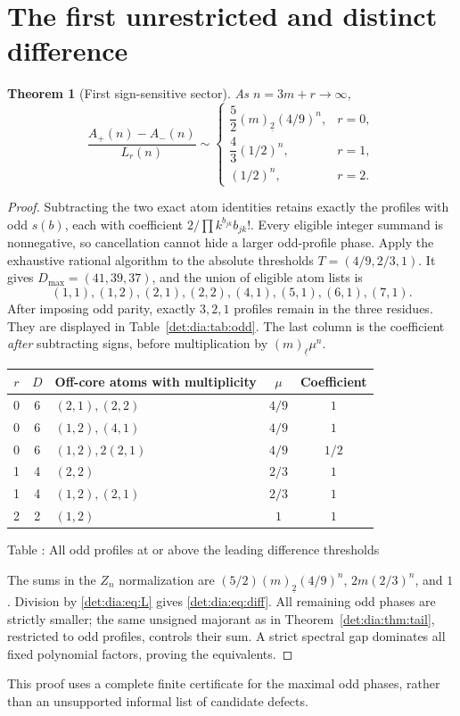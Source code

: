 \documentclass[11pt,letterpaper]{article}
\numberwithin{equation}{section}
\newtheorem{theorem}{Theorem}[section]
\theoremstyle{definition}\newtheorem{definition}[theorem]{Definition}
\theoremstyle{remark}\newtheorem{remark}[theorem]{Remark}
\newcommand{\fall}[2]{(#1)_{\underline{#2}}}
\begin{document}
\section{The first unrestricted and distinct difference}
\begin{theorem}[First sign-sensitive sector]\label{det:dia:thm:diff}
As $n=3m+r\to\infty$,
\begin{equation}\label{det:dia:eq:diff}
 \frac{A_+(n)-A_-(n)}{L_r(n)}\sim
 \begin{cases}
 \dfrac52\fall{m}{2}(4/9)^n,&r=0,\\[2pt]
 \dfrac43(1/2)^n,&r=1,\\[2pt]
 (1/2)^n,&r=2.
 \end{cases}
\end{equation}
\end{theorem}
\begin{proof}
Subtracting the two exact atom identities retains exactly the profiles
with odd $s(b)$, each with coefficient
$2/\prod k^{b_{jk}}b_{jk}!$. Every eligible integer summand is
nonnegative, so cancellation cannot hide a larger odd-profile phase.
Apply the exhaustive rational algorithm to the absolute thresholds
$T=(4/9,2/3,1)$. It gives $D_{\max}=(41,39,37)$, and the union of
eligible atom lists is
\[
 (1,1),(1,2),(2,1),(2,2),(4,1),(5,1),(6,1),(7,1).
\]
After imposing odd parity, exactly $3,2,1$ profiles remain in the three
residues. They are displayed in Table~\ref{det:dia:tab:odd}. The last column is
the coefficient \emph{after} subtracting signs, before multiplication by
$\fall{m}{\ell}\mu^n$.
\begin{center}
\begin{tabular}{cclcc}
\toprule
$r$&$D$&Off-core atoms with multiplicity&$\mu$&Coefficient\\
\midrule
0&6&$(2,1),(2,2)$&$4/9$&$1$\\
0&6&$(1,2),(4,1)$&$4/9$&$1$\\
0&6&$(1,2),2(2,1)$&$4/9$&$1/2$\\
1&4&$(2,2)$&$2/3$&$1$\\
1&4&$(1,2),(2,1)$&$2/3$&$1$\\
2&2&$(1,2)$&$1$&$1$\\
\bottomrule
\end{tabular}
\label{det:dia:tab:odd}\par\smallskip
\small Table \thetable: All odd profiles at or above the leading difference thresholds
\end{center}
The sums in the $Z_n$ normalization are
$(5/2)\fall{m}{2}(4/9)^n$, $2m(2/3)^n$, and $1$.
Division by \eqref{det:dia:eq:L} gives \eqref{det:dia:eq:diff}. All remaining odd phases
are strictly smaller; the same unsigned majorant as in
Theorem~\ref{det:dia:thm:tail}, restricted to odd profiles, controls their sum.
A strict spectral gap dominates all fixed polynomial factors, proving
the equivalents.
\end{proof}
This proof uses a complete finite certificate for the maximal odd
phases, rather than an unsupported informal list of candidate defects.
\end{document}
